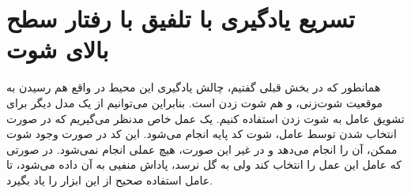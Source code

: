 \section{تسریع یادگیری با تلفیق با رفتار سطح بالای شوت}
همانطور که در بخش قبلی گفتیم، چالش یادگیری این محیط در واقع هم رسیدن به موقعیت شوت‌زنی، و هم شوت زدن است.
بنابراین می‌توانیم از یک مدل دیگر برای تشویق عامل به شوت زدن استفاده کنیم.
یک عمل خاص مدنظر می‌گیریم که در صورت انتخاب شدن توسط عامل، شوت کد پایه  
انجام می‌شود. این کد در صورت وجود شوت ممکن، آن را انجام می‌دهد و در غیر این صورت، هیچ عملی انجام نمی‌شود.
در صورتی که عامل این عمل را انتخاب کند ولی به گل نرسد، پاداش منفیی به آن داده می‌شود، تا عامل استفاده صحیح از این ابزار را یاد بگیرد.
